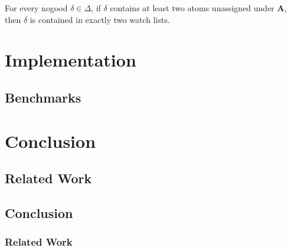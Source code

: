 \documentclass{vutinfth} %
\theoremstyle{example}
\theoremstyle{definition}
\theoremstyle{theorem}
\theoremstyle{lemma}
\theoremstyle{corollary}
\newcommand{\ass}{\mathbf{A}}
\begin{document}



For every nogood $\delta \in \Delta$, if $\delta$ contains at least two atoms unassigned under $\ass$, then $\delta$ is contained in exactly two watch lists.

\chapter{Implementation}

\section{Benchmarks}

\chapter{Conclusion}

\section{Related Work}

\section{Conclusion}

\subsection{Related Work}

\backmatter

\listoffigures %

\listoftables %

\listofalgorithms
{}

\printindex

\printglossaries



\end{document}
